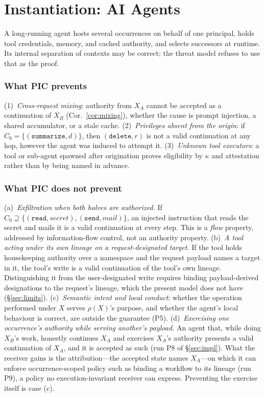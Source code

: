\documentclass[conference]{IEEEtran}
\begin{document}
\section{Instantiation: AI Agents}\label{sec:agents}

A long-running agent hosts several occurrences on behalf of one principal, holds tool credentials, memory, and cached authority, and selects successors at runtime. Its internal separation of contexts may be correct; the threat model refuses to use that as the proof.

\subsubsection*{What PIC prevents}
(1)~\emph{Cross-request mixing}: authority from $X_A$ cannot be accepted as a continuation of $X_B$ (Cor.~\ref{cor:mixing}), whether the cause is prompt injection, a shared accumulator, or a stale cache. (2)~\emph{Privileges absent from the origin}: if $C_0=\{(\texttt{summarize},d)\}$, then $(\texttt{delete},r)$ is not a valid continuation at any hop, however the agent was induced to attempt it. (3)~\emph{Unknown tool executors}: a tool or sub-agent spawned after origination proves eligibility by $\kappa$ and attestation rather than by being named in advance.

\subsubsection*{What PIC does not prevent}
(a)~\emph{Exfiltration when both halves are authorized.} If $C_0\supseteq\{(\texttt{read},\mathit{secret}),(\texttt{send},\mathit{mail})\}$, an injected instruction that reads the secret and mails it is a valid continuation at every step. This is a \emph{flow} property, addressed by information-flow control, not an authority property. (b)~\emph{A tool acting under its own lineage on a request-designated target.} If the tool holds housekeeping authority over a namespace and the request payload names a target in it, the tool's write is a valid continuation of the tool's own lineage. Distinguishing it from the user-designated write requires binding payload-derived designations to the request's lineage, which the present model does not have (\S\ref{sec:limits}). (c)~\emph{Semantic intent and local conduct}: whether the operation performed under $X$ serves $\rho(X)$'s purpose, and whether the agent's local behaviour is correct, are outside the guarantee (P5). (d)~\emph{Exercising one occurrence's authority while serving another's payload.} An agent that, while doing $X_B$'s work, honestly continues $X_A$ and exercises $X_A$'s authority presents a valid continuation of $X_A$, and it is accepted as such (run P8 of \S\ref{sec:impl}). What the receiver gains is the attribution---the accepted state names $X_A$---on which it can enforce occurrence-scoped policy such as binding a workflow to its lineage (run P9), a policy no execution-invariant receiver can express. Preventing the exercise itself is case (c).
\end{document}
